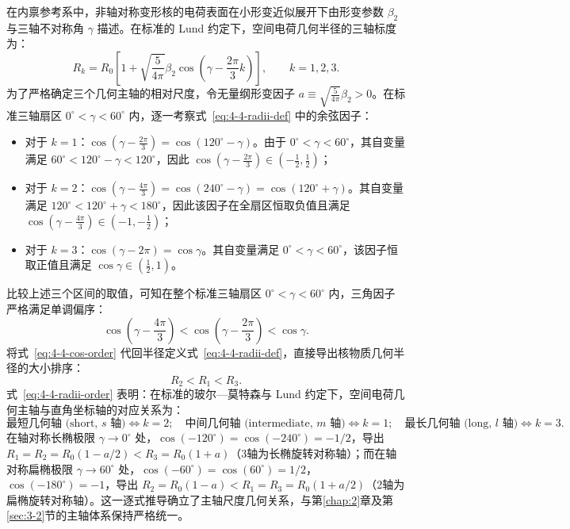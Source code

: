 在内禀参考系中，非轴对称变形核的电荷表面在小形变近似展开下由形变参数 $\beta_2$ 与三轴不对称角 $\gamma$ 描述。在标准的 Lund 约定下，空间电荷几何半径的三轴标度为：
\begin{equation}\label{eq:4-4-radii-def}
R_k = R_0 \left[ 1 + \sqrt{\frac{5}{4\pi}}\beta_2 \cos\left(\gamma - \frac{2\pi}{3} k\right) \right], \qquad k = 1, 2, 3.
\end{equation}
为了严格确定三个几何主轴的相对尺度，令无量纲形变因子 $a \equiv \sqrt{\frac{5}{4\pi}}\beta_2 > 0$。在标准三轴扇区 $0^\circ < \gamma < 60^\circ$ 内，逐一考察式~\eqref{eq:4-4-radii-def} 中的余弦因子：
\begin{itemize}
\item 对于 $k=1$：$\cos\left(\gamma - \frac{2\pi}{3}\right) = \cos\left(120^\circ - \gamma\right)$。由于 $0^\circ < \gamma < 60^\circ$，其自变量满足 $60^\circ < 120^\circ - \gamma < 120^\circ$，因此 $\cos\left(\gamma - \frac{2\pi}{3}\right) \in \left(-\frac{1}{2}, \frac{1}{2}\right)$；
\item 对于 $k=2$：$\cos\left(\gamma - \frac{4\pi}{3}\right) = \cos\left(240^\circ - \gamma\right) = \cos\left(120^\circ + \gamma\right)$。其自变量满足 $120^\circ < 120^\circ + \gamma < 180^\circ$，因此该因子在全扇区恒取负值且满足 $\cos\left(\gamma - \frac{4\pi}{3}\right) \in \left(-1, -\frac{1}{2}\right)$；
\item 对于 $k=3$：$\cos\left(\gamma - 2\pi\right) = \cos\gamma$。其自变量满足 $0^\circ < \gamma < 60^\circ$，该因子恒取正值且满足 $\cos\gamma \in \left(\frac{1}{2}, 1\right)$。
\end{itemize}
比较上述三个区间的取值，可知在整个标准三轴扇区 $0^\circ < \gamma < 60^\circ$ 内，三角因子严格满足单调偏序：
\begin{equation}\label{eq:4-4-cos-order}
\cos\left(\gamma - \frac{4\pi}{3}\right) < \cos\left(\gamma - \frac{2\pi}{3}\right) < \cos\gamma.
\end{equation}
将式~\eqref{eq:4-4-cos-order} 代回半径定义式~\eqref{eq:4-4-radii-def}，直接导出核物质几何半径的大小排序：
\begin{equation}\label{eq:4-4-radii-order}
R_2 < R_1 < R_3.
\end{equation}
式~\eqref{eq:4-4-radii-order} 表明：在标准的玻尔—莫特森与 Lund 约定下，空间电荷几何主轴与直角坐标轴的对应关系为：
\begin{equation}\label{eq:4-4-axes-identity}
\text{最短几何轴 (short, $s$ 轴)} \iff k = 2; \quad
\text{中间几何轴 (intermediate, $m$ 轴)} \iff k = 1; \quad
\text{最长几何轴 (long, $l$ 轴)} \iff k = 3.
\end{equation}
在轴对称长椭极限 $\gamma \to 0^\circ$ 处，$\cos(-120^\circ) = \cos(-240^\circ) = -1/2$，导出 $R_1 = R_2 = R_0(1 - a/2) < R_3 = R_0(1+a)$（3轴为长椭旋转对称轴）；而在轴对称扁椭极限 $\gamma \to 60^\circ$ 处，$\cos(-60^\circ) = \cos(60^\circ) = 1/2$，$\cos(-180^\circ) = -1$，导出 $R_2 = R_0(1-a) < R_1 = R_3 = R_0(1+a/2)$（2轴为扁椭旋转对称轴）。这一逐式推导确立了主轴尺度几何关系，与第\ref{chap:2}章及第\ref{sec:3-2}节的主轴体系保持严格统一。

